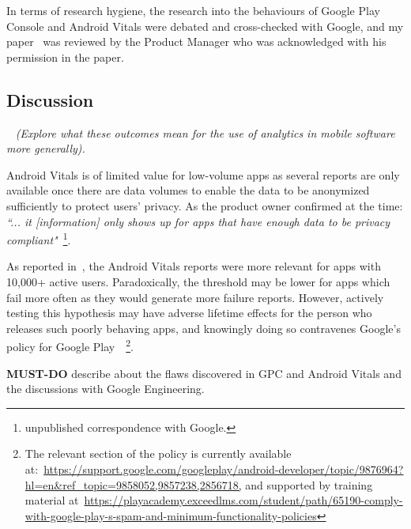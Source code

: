 In terms of research hygiene, the research into the behaviours of Google Play Console and Android Vitals were debated and cross-checked with Google, and my paper~\citep{harty_google_play_console_insightful_development_using_android_vitals_and_pre_launch_reports} was reviewed by the Product Manager who was acknowledged with his permission in the paper.


\subsection{Discussion}~\label{case-study-kiwix-discussion}
\textit{(Explore what these outcomes mean for the use of analytics in mobile software more generally).}

Android Vitals is of limited value for low-volume apps as several reports are only available once there are data volumes to enable the data to be anonymized sufficiently to protect users' privacy. As the product owner confirmed at the time: \emph{``... it [information] only shows up for apps that have enough data to be privacy compliant"}~\footnote{unpublished correspondence with Google.}.

As reported in~\citep{harty_google_play_console_insightful_development_using_android_vitals_and_pre_launch_reports}, the Android Vitals reports were more relevant for apps with 10,000+ active users. Paradoxically, the threshold may be lower for apps which fail more often as they would generate more failure reports. However, actively testing this hypothesis may have adverse lifetime effects for the person who releases such poorly behaving apps, and knowingly doing so contravenes Google's policy for Google Play~\citep{google_play_developer_policy_center}~\footnote{The relevant section of the policy is currently available at:~\url{https://support.google.com/googleplay/android-developer/topic/9876964?hl=en&ref_topic=9858052,9857238,2856718,} and supported by training material at~\url{https://playacademy.exceedlms.com/student/path/65190-comply-with-google-play-s-spam-and-minimum-functionality-policies}}.


\textbf{MUST-DO} describe about the flaws discovered in GPC and Android Vitals and the discussions with Google Engineering.

